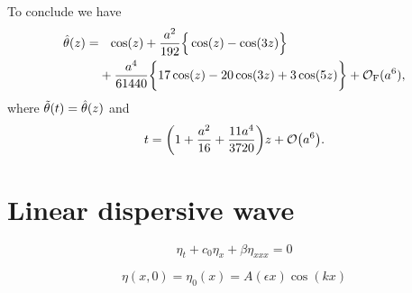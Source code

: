 \documentclass[11pt,letter, swedish, english
]{article}
\renewcommand{\thesubsection}{\arabic{section} (\alph{subsection})}
\begin{document}
To conclude we have
\begin{equation}
\begin{aligned}
\hat{\theta}(z)=&\phantom{+}\cos(z)
+\frac{a^2}{192}\Big\{\cos(z)-\cos(3z) \Big\}\\
&+\frac{a^4}{61440}
\bigg\{
17\cos(z)-20\cos(3z)+3\cos(5z)
\bigg\}
 + \mathcal{O}_\text{F}(a^6),
\end{aligned}
\end{equation}
where $\tilde{\theta}(t)=\hat{\theta}(z)$ and
\begin{equation}
t=\qty(1+\frac{a^2}{16}+\frac{11a^4}{3720})z+\order{a^6}.
\end{equation}

\section{Linear dispersive wave}
\renewcommand{\thesubsection}{\arabic{section} (\alph{subsection})}

\begin{equation}
\eta_t + c_0\eta_{x}+\beta\eta_{xxx}=0
\end{equation}

\begin{equation}
\eta(x, 0)=\eta_0(x)=A(\epsilon x)\cos(kx)
\end{equation}
\end{document}
